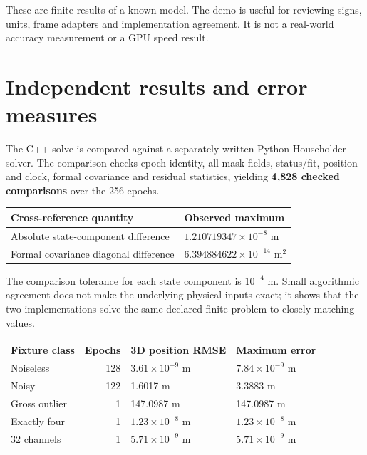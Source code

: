 These are finite results of a known model. The demo is useful for reviewing signs,
units, frame adapters and implementation agreement. It is not a real-world accuracy
measurement or a GPU speed result.
\clearpage

\section{Independent results and error measures}
The C++ solve is compared against a separately written Python Householder solver.
The comparison checks epoch identity, all mask fields, status/fit, position and clock,
formal covariance and residual statistics, yielding \textbf{4,828 checked comparisons}
over the 256 epochs.

\begin{center}
\begin{tabularx}{\textwidth}{@{}P{.54\textwidth}Y@{}}\toprule
\textbf{Cross-reference quantity} & \textbf{Observed maximum}\\\midrule
Absolute state-component difference & $1.210719347\times10^{-8}$ m\\
Formal covariance diagonal difference & $6.394884622\times10^{-14}$ m$^2$\\\bottomrule
\end{tabularx}
\end{center}

The comparison tolerance for each state component is $10^{-4}$ m. Small algorithmic
agreement does not make the underlying physical inputs exact; it shows that the two
implementations solve the same declared finite problem to closely matching values.

\begin{center}
\begin{tabularx}{\textwidth}{@{}P{.31\textwidth}rYY@{}}\toprule
\textbf{Fixture class} & \textbf{Epochs} & \textbf{3D position RMSE} & \textbf{Maximum error}\\\midrule
Noiseless &128&$3.61\times10^{-9}$ m&$7.84\times10^{-9}$ m\\
Noisy &122&1.6017 m&3.3883 m\\
Gross outlier &1&147.0987 m&147.0987 m\\
Exactly four &1&$1.23\times10^{-8}$ m&$1.23\times10^{-8}$ m\\
32 channels &1&$5.71\times10^{-9}$ m&$5.71\times10^{-9}$ m\\\bottomrule
\end{tabularx}
\end{center}

